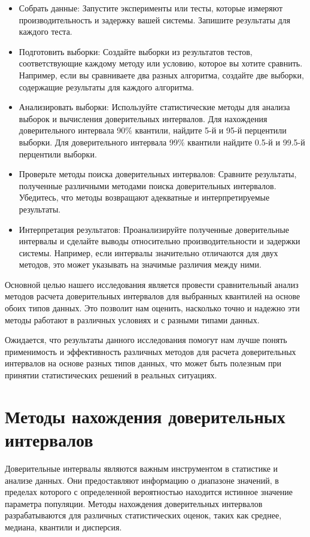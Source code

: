 \documentclass[specialist,
               substylefile = spbu_report.rtx,
               subf,href,colorlinks=true, 12pt]{disser}
\begin{document}
\begin{itemize}
 
\item  Собрать данные: Запустите эксперименты или тесты, которые измеряют производительность и задержку вашей системы. Запишите результаты для каждого теста.

\item Подготовить выборки: Создайте выборки из результатов тестов, соответствующие каждому методу или условию, которое вы хотите сравнить. Например, если вы сравниваете два разных алгоритма, создайте две выборки, содержащие результаты для каждого алгоритма.

\item Анализировать выборки: Используйте статистические методы для анализа выборок и вычисления доверительных интервалов. Для нахождения доверительного интервала 90\% квантили, найдите 5-й и 95-й перцентили выборки. Для доверительного интервала 99\% квантили найдите 0.5-й и 99.5-й перцентили выборки.

\item  Проверьте методы поиска доверительных интервалов: Сравните результаты, полученные различными методами поиска доверительных интервалов. Убедитесь, что методы возвращают адекватные и интерпретируемые результаты.

\item Интерпретация результатов: Проанализируйте полученные доверительные интервалы и сделайте выводы относительно производительности и задержки системы. Например, если интервалы значительно отличаются для двух методов, это может указывать на значимые различия между ними.
\end{itemize}

Основной целью нашего исследования является провести сравнительный анализ методов расчета доверительных интервалов для выбранных квантилей на основе обоих типов данных. Это позволит нам оценить, насколько точно и надежно эти методы работают в различных условиях и с разными типами данных.

Ожидается, что результаты данного исследования помогут нам лучше понять применимость и эффективность различных методов для расчета доверительных интервалов на основе разных типов данных, что может быть полезным при принятии статистических решений в реальных ситуациях.
\newpage
\section{Методы нахождения доверительных интервалов}
Доверительные интервалы являются важным инструментом в статистике и анализе данных. Они предоставляют информацию о диапазоне значений, в пределах которого с определенной вероятностью находится истинное значение параметра популяции. Методы нахождения доверительных интервалов разрабатываются для различных статистических оценок, таких как среднее, медиана, квантили и дисперсия.
\end{document}
